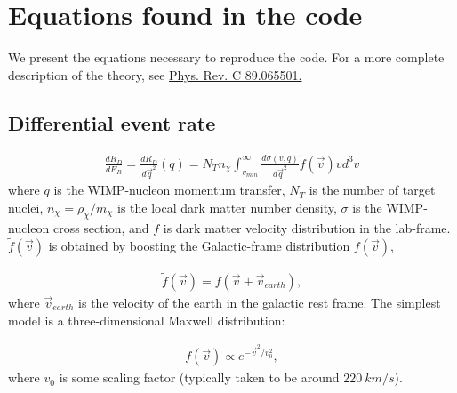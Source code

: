 \documentclass[
14pt, %
a4paper, %
oneside, %
headinclude,footinclude, %
BCOR5mm, %
]{scrartcl}
\begin{document}
\section{Equations found in the code}
We present the equations necessary to reproduce the code. For a more complete
description of the theory, see 
\href{https://link.aps.org/doi/10.1103/PhysRevC.89.065501}{Phys. Rev. C 89.065501.}
\subsection{Differential event rate}
\begin{equation}\label{ER}
\begin{split}
	\frac{dR_D}{dE_R} = \frac{dR_D}{d\vec{q}^2}(q)
	 = N_T n_\chi \int_{v_{min}}^\infty \frac{d\sigma(v,q)}{d\vec{q}^2} \tilde{f}(\vec{v})vd^3v
\end{split}
\end{equation}
where $q$ is the WIMP-nucleon momentum transfer, $N_T$ is the number of target 
nuclei, $n_\chi = \rho_\chi/m_\chi$ is the local dark matter number density, $\sigma$ 
is the WIMP-nucleon cross section, and $\tilde{f}$ is dark matter velocity 
distribution in the lab-frame. $\tilde{f}(\vec{v})$ is obtained by boosting 
the Galactic-frame distribution $f(\vec{v})$, 

\begin{equation}\label{boost}
\begin{split}
	\tilde{f}(\vec{v}) = f(\vec{v} + \vec{v}_{earth}),
\end{split}
\end{equation}
where $\vec{v}_{earth}$ is the velocity of the earth in the galactic rest 
frame. The simplest model is a three-dimensional Maxwell distribution:

\begin{equation}
\begin{split}
	f(\vec{v}) \propto e^{-\vec{v}^2/v_0^2},
\end{split}
\end{equation}
where $v_0$ is some scaling factor (typically taken to be around $220\ km/s$).
\end{document}
